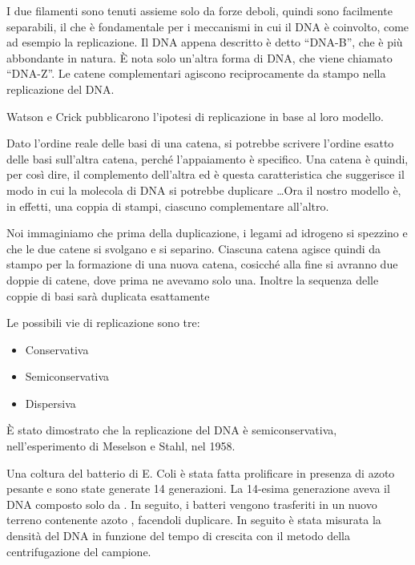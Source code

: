 I due filamenti sono tenuti assieme solo da forze deboli, quindi sono facilmente separabili, il che è fondamentale per i meccanismi in cui il DNA è coinvolto, come ad esempio la replicazione.
Il DNA appena descritto è detto ``DNA-B'', che è più abbondante in natura. È nota solo un'altra forma di DNA, che viene chiamato ``DNA-Z''.
Le catene complementari agiscono reciprocamente da stampo nella replicazione del DNA.


\clearpage

Watson e Crick pubblicarono l'ipotesi di replicazione in base al loro modello.

\begin{quoting}
Dato l'ordine reale delle basi di una catena, si potrebbe scrivere l'ordine esatto delle basi sull'altra catena, perché l'appaiamento è specifico.
Una catena è quindi, per così dire, il complemento dell'altra ed è questa caratteristica che suggerisce il modo in cui la molecola di DNA si potrebbe duplicare \ldots Ora il nostro modello è, in effetti, una coppia di stampi, ciascuno complementare all'altro.

Noi immaginiamo che prima della duplicazione, i legami ad idrogeno si spezzino e che le due catene si svolgano e si separino. Ciascuna catena agisce quindi da stampo per la formazione di una nuova catena, cosicché alla fine si avranno due doppie di catene, dove prima ne avevamo solo una. Inoltre la sequenza delle coppie di basi sarà duplicata esattamente
\end{quoting}

Le possibili vie di replicazione sono tre:
\begin{itemize}
\item Conservativa
\item Semiconservativa
\item Dispersiva
\end{itemize}


È stato dimostrato che la replicazione del DNA è semiconservativa, nell'esperimento di Meselson e Stahl, nel 1958.

Una coltura del batterio di E. Coli è stata fatta prolificare in presenza di azoto pesante  e sono state generate 14 generazioni. La 14-esima generazione aveva il DNA composto solo da . In seguito, i batteri vengono trasferiti in un nuovo terreno contenente azoto , facendoli duplicare. In seguito è stata misurata la densità del DNA in funzione del tempo di crescita con il metodo della centrifugazione del campione.

